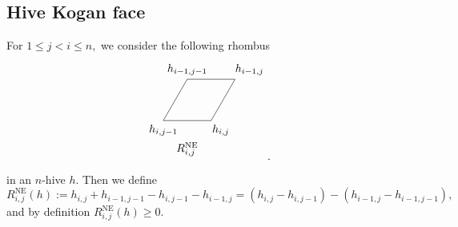 \documentclass[11pt,reqno]{amsart}
\DeclareMathOperator{\NE}{NE}
\begin{document}
\subsection{Hive Kogan face} 
\label{sec:hive-kogan}
For $1 \leq j < i \leq n,$ we consider the following rhombus 
$$
\begin{tikzpicture}[scale=1.5]
  \draw (0,0) -- (1,0);
  \draw (0,0) -- (0.5, 0.5*1.732);
  \draw (0.5, 0.5*1.732) -- (1.5, 0.5*1.732);
  \draw (1,0) -- (1.5,0.5*1.732);
  \draw (0.5, 0.5*1.732+0.2) node {$h_{i-1,j-1}$};
  \draw (1.5+0.3, 0.5*1.732+0.2) node {$h_{i-1,j}$};
  \draw (0,-0.2) node {$h_{i,j-1}$};
  \draw (1.2,-0.2) node {$h_{i,j}$};
  \node at (0.5,-0.6) {$R^{\NE}_{i,j}$};
\end{tikzpicture}.
$$
in an $n$-hive $h$. Then we define $$R^{\NE}_{i,j}(h):=h_{i,j}+h_{i-1,j-1}-h_{i,j-1}-h_{i-1,j}= (h_{i,j}-h_{i,j-1})-(h_{i-1,j}-h_{i-1,j-1}),$$
and by definition $R^{\NE}_{i,j}(h) \geq 0$.
\end{document}
